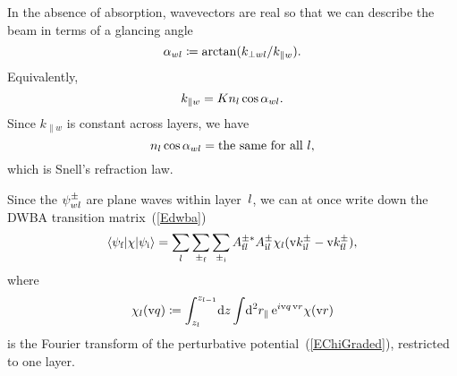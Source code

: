 In the absence of absorption,
wavevectors are real
so that we can describe the beam in terms of a glancing angle
\begin{equation}\label{Edef_alpha}
  \alpha_{wl}\coloneqq \arctan(k_{\perp wl}/k_{\parallel w}).  
\end{equation}
Equivalently,
\begin{equation}
  k_{\parallel w}=K n_l \cos\alpha_{wl}. 
\end{equation}
Since $k_{\parallel w}$ is constant across layers,
we have
\begin{equation}\label{ESnell}
  n_l \cos\alpha_{wl} = \text{the same for all }l,
\end{equation}
which is Snell's refraction law.

Since the $\psi^\pm_{wl}$ are plane waves within layer~$l$,
we can at once write down the DWBA transition matrix~(\ref{Edwba})
%
\begin{equation}\label{Edwba_ml0}
  \left\langle \psi_{\text{f}}|\chi|\psi_{\text{i}}\right\rangle
  = \sum_{l} \sum_{\pm_{\text{f}}} \sum_{\pm_{\text{i}}}
    A^{\pm *}_{\text{f} l} A^\pm_{\text{i} l} 
     \chi_l(\text{v}{k}^\pm_{\text{i} l}-\text{v}{k}^\pm_{\text{f} l}),
\end{equation}
where
\begin{equation}\label{Echij}
  \chi_l(\text{v}{q})
  \coloneqq  \int_{z_l}^{z_{l-1}}\!\text{d} z \int\!\text{d}^2r_\parallel\, \text{e}^{i\text{v}{q}\,\text{v}{r}}\chi(\text{v}{r})
\end{equation}
%
is the Fourier transform
of the perturbative potential~(\ref{EChiGraded}),
restricted to one layer.

